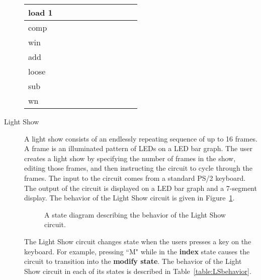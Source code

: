\begin{description}
\begin{landscape}
\begin{table}
{\begin{tabular}{l|l|l|l|l|l|l|l|l|l|l}
                        load 1&       &       &       &           &         &       &       &        &       & \\ \hline
                        comp  &       &       &       &           &         &       &       &        &       & \\ \hline
                        win   &       &       &       &           &         &       &       &        &       & \\ \hline
                        add   &       &       &       &           &         &       &       &        &       & \\ \hline
                        loose &       &       &       &           &         &       &       &        &       & \\ \hline
                        sub &       &       &       &           &         &       &       &        &       & \\ \hline
                        wn    &       &       &       &           &         &       &       &        &       & \\
                    \end{tabular}
                }
            \end{table}
        \end{landscape}

    \item[Light Show]

        A light show consists of an endlessly repeating sequence of up to 16 frames.
        A frame is an illuminated pattern of LEDs on a LED bar graph. The user
        creates a light show by specifying the number of frames in the show, editing
        those frames, and then instructing the circuit to cycle through the frames.
        The input to the circuit comes from a standard PS/2 keyboard. The output of
        the circuit is displayed on a LED bar graph and a 7-segment display. The
        behavior of the Light Show circuit is given in Figure~\ref{fig:LSbehavior}.

        \begin{figure}[ht]
            \caption{A state diagram describing the behavior of the Light Show circuit.}
            \label{fig:LSbehavior}
        \end{figure}

        The Light Show circuit changes state when the users presses a key on
        the keyboard. For example, pressing ``M" while in the \textbf{ index } state causes
        the circuit to transition into the \textbf{ modify state}. The behavior of the
        Light Show circuit in each of its states is described in
        Table~\ref{table:LSbehavior}.


\end{description}
